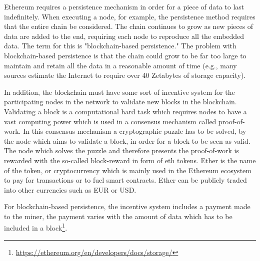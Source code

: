 \documentclass[final]{vutinfth}
\begin{document}
Ethereum requires a persistence mechanism in order for a piece of data to last indefinitely. When executing a node, for example, the persistence method requires that the entire chain be considered. The chain continues to grow as new pieces of data are added to the end, requiring each node to reproduce all the embedded data. The term for this is "blockchain-based persistence." The problem with blockchain-based persistence is that the chain could grow to be far too large to maintain and retain all the data in a reasonable amount of time (e.g., many sources estimate the Internet to require over 40 Zetabytes of storage capacity). 

In addition, the blockchain must have some sort of incentive system for the participating nodes in the network to validate new blocks in the blockchain. Validating a block is a computational hard task which requires nodes to have a vast computing power which is used in a consensus mechanism called proof-of-work. In this consensus mechanism a cryptographic puzzle has to be solved, by the node which aims to validate a block, in order for a block to be seen as valid. The node which solves the puzzle and therefore presents the proof-of-work is rewarded with the so-called block-reward in form of \acrlong{eth} tokens. Ether is the name of the token, or cryptocurrency which is mainly used in the Ethereum ecosystem to pay for transactions or to fuel smart contracts. Ether can be publicly traded into other currencies such as EUR or USD.

For blockchain-based persistence, the incentive system includes a payment made to the miner, the payment varies with the amount of data which has to be included in a block\footnote{\url{https://ethereum.org/en/developers/docs/storage/}}.
\end{document}
